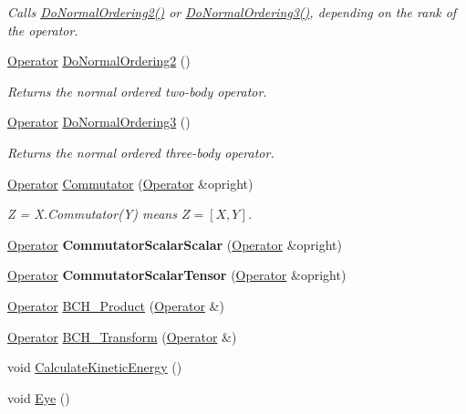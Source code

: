 \begin{DoxyCompactItemize}
\begin{DoxyCompactList}\small\item\em Calls \hyperlink{classOperator_a652d989590422a2b26e662625b07254e}{Do\-Normal\-Ordering2()} or \hyperlink{classOperator_a7fd029569796107c87ff17c5a7912480}{Do\-Normal\-Ordering3()}, depending on the rank of the operator. \end{DoxyCompactList}\item 
\hyperlink{classOperator}{Operator} \hyperlink{classOperator_a652d989590422a2b26e662625b07254e}{Do\-Normal\-Ordering2} ()
\begin{DoxyCompactList}\small\item\em Returns the normal ordered two-\/body operator. \end{DoxyCompactList}\item 
\hyperlink{classOperator}{Operator} \hyperlink{classOperator_a7fd029569796107c87ff17c5a7912480}{Do\-Normal\-Ordering3} ()
\begin{DoxyCompactList}\small\item\em Returns the normal ordered three-\/body operator. \end{DoxyCompactList}\item 
\hypertarget{classOperator_a9d78ca5fd265cf4ccc6cda81d35cb086}{\hyperlink{classOperator}{Operator} \hyperlink{classOperator_a9d78ca5fd265cf4ccc6cda81d35cb086}{Commutator} (\hyperlink{classOperator}{Operator} \&opright)}\label{classOperator_a9d78ca5fd265cf4ccc6cda81d35cb086}

\begin{DoxyCompactList}\small\item\em Z = X.\-Commutator(\-Y) means $ Z = [X,Y] $. \end{DoxyCompactList}\item 
\hypertarget{classOperator_a55b95477ad8674877eb4d15491cfe9a0}{\hyperlink{classOperator}{Operator} {\bfseries Commutator\-Scalar\-Scalar} (\hyperlink{classOperator}{Operator} \&opright)}\label{classOperator_a55b95477ad8674877eb4d15491cfe9a0}

\item 
\hypertarget{classOperator_a7db0372f91cffc85b293f7750c72944a}{\hyperlink{classOperator}{Operator} {\bfseries Commutator\-Scalar\-Tensor} (\hyperlink{classOperator}{Operator} \&opright)}\label{classOperator_a7db0372f91cffc85b293f7750c72944a}

\item 
\hyperlink{classOperator}{Operator} \hyperlink{classOperator_a6a91cd02db723ee28b7532e6af029033}{B\-C\-H\-\_\-\-Product} (\hyperlink{classOperator}{Operator} \&)
\item 
\hyperlink{classOperator}{Operator} \hyperlink{classOperator_adc5537604f6b71121163370aca79dfef}{B\-C\-H\-\_\-\-Transform} (\hyperlink{classOperator}{Operator} \&)
\item 
void \hyperlink{classOperator_a701c64f8be794e89fd28a643b56d534a}{Calculate\-Kinetic\-Energy} ()
\item 
\hypertarget{classOperator_a03a378f0da2fe71d8160bd3262891457}{void \hyperlink{classOperator_a03a378f0da2fe71d8160bd3262891457}{Eye} ()}\label{classOperator_a03a378f0da2fe71d8160bd3262891457}


\end{DoxyCompactItemize}
